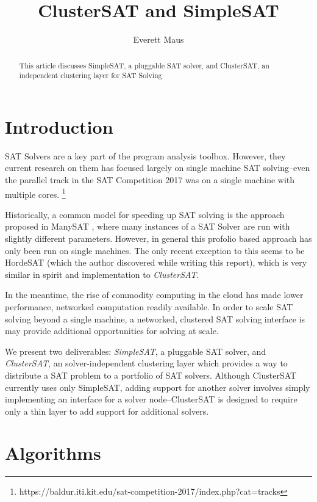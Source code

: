 \documentclass[10pt]{article}
\title{ClusterSAT and SimpleSAT}
\author{Everett Maus}
\begin{document}
\maketitle

\begin{abstract}
   This article discusses SimpleSAT, a pluggable SAT solver, and ClusterSAT, an independent clustering layer for SAT Solving
\end{abstract}

\section{Introduction}
  SAT Solvers are a key part of the program analysis toolbox.  However, they current research on
  them has focused largely on single machine SAT solving--even the parallel track in the SAT 
  Competition 2017 was on a single machine with multiple cores. \footnote{https://baldur.iti.kit.edu/sat-competition-2017/index.php?cat=tracks}

  Historically, a common model for speeding up SAT solving is the approach proposed in ManySAT \cite{Hamadi09manysat:a},
  where many instances of a SAT Solver are run with slightly different parameters.  However, in general this profolio
  based approach has only been run on single machines.  The only recent exception to this seems to be HordeSAT \cite{hordesat} (which the author discovered while writing this report), 
  which is very similar in spirit and implementation to \textit{ClusterSAT}.

  In the meantime, the rise of commodity computing in the cloud has made lower performance, networked
  computation readily available.  In order to scale SAT solving beyond a single machine, a networked, clustered
  SAT solving interface is may provide additional opportunities for solving at scale.

  We present two deliverables:  \textit{SimpleSAT}, a pluggable SAT solver, and \textit{ClusterSAT}, an solver-independent clustering layer which provides
  a way to distribute a SAT problem to a portfolio of SAT solvers.  Although ClusterSAT currently uses only SimpleSAT, adding support
  for another solver involves simply implementing an interface for a solver node--ClusterSAT is designed to require only a thin layer to add support for additional solvers.

\section{Algorithms}
\end{document}
